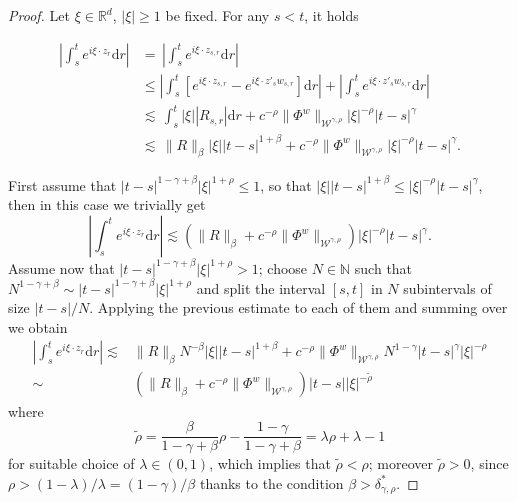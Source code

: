 \documentclass[10pt]{article}
\newcommand{\mathd}{\mathrm{d}}
\begin{document}
\begin{proof}
  Let $\xi \in \mathbb{R}^d$, $| \xi | \geqslant 1$ be fixed. For any $s < t$,
  it holds
  
  \begin{align*}
    \left| \int_s^t e^{i \xi \cdot z_r} \mathd r \right| & = \, \left|
    \int_s^t e^{i \xi \cdot z_{s, r}} \mathd r \right|\\
    & \leqslant \left| \int_s^t [e^{i \xi \cdot z_{s, r}} - e^{i \xi \cdot
    z'_s w_{s, r}}] \mathd r \right| + \left| \int_s^t e^{i \xi \cdot z'_s
    w_{s, r}} \mathd r \right|\\
    & \lesssim \, \int_s^t | \xi | | R_{s, r} | \mathd r + c^{- \rho} \|
    \Phi^w \|_{\mathcal{W}^{\gamma, \rho}} | \xi |^{- \rho} | t - s
    |^{\gamma}\\
    & \lesssim \, \| R \|_{\beta} | \xi | | t - s |^{1 + \beta} + c^{- \rho}
    \| \Phi^w \|_{\mathcal{W}^{\gamma, \rho}} | \xi |^{- \rho} | t - s
    |^{\gamma} .
  \end{align*}
  
  First assume that $| t - s |^{1 - \gamma + \beta} | \xi |^{1 + \rho}
  \leqslant 1$, so that $| \xi | | t - s |^{1 + \beta} \leqslant | \xi |^{-
  \rho} | t - s |^{\gamma}$, then in this case we trivially get
  \begin{equation}
    \left| \int_s^t e^{i \xi \cdot z_r} \mathd r \right| \lesssim (\| R
    \|_{\beta} + c^{- \rho} \| \Phi^w \|_{\mathcal{W}^{\gamma, \rho}}) | \xi
    |^{- \rho} | t - s |^{\gamma} . \label{sec5.3 eq1}
  \end{equation}
  Assume now that $| t - s |^{1 - \gamma + \beta} | \xi |^{1 + \rho} > 1$;
  choose $N \in \mathbb{N}$ such that $N^{1 - \gamma + \beta} \sim | t - s
  |^{1 - \gamma + \beta} | \xi |^{1 + \rho}$ and split the interval $[s, t]$
  in $N$ subintervals of size $| t - s | / N$. Applying the previous estimate
  to each of them and summing over we obtain
  \begin{equation}\label{eq:proof-pert}
  \begin{split}
    \left| \int_s^t e^{i \xi \cdot z_r} \mathd r \right| \lesssim & \| R
    \|_{\beta} N^{- \beta} | \xi | | t - s |^{1 + \beta} + c^{- \rho} \|
    \Phi^w \|_{\mathcal{W}^{\gamma, \rho}} N^{1 - \gamma} | t - s |^{\gamma} |
    \xi |^{- \rho}\\
    \sim & (\| R \|_{\beta} + c^{- \rho} \| \Phi^w \|_{\mathcal{W}^{\gamma,
    \rho}}) | t - s |  | \xi |^{- \tilde{\rho}}
  \end{split}\end{equation}
  where
  \[ \tilde{\rho} = \frac{\beta}{1 - \gamma + \beta} \rho - \frac{1 -
     \gamma}{1 - \gamma + \beta} = \lambda \rho + \lambda - 1 \]
  for suitable choice of $\lambda \in (0, 1)$, which implies that $\tilde\rho < \rho$; moreover $\tilde\rho>0$, since $\rho>(1-\lambda)/\lambda=(1-\gamma)/\beta$ thanks to the condition $\beta>\delta^\ast_{\gamma,\rho}$.
  

\end{proof}
\end{document}

